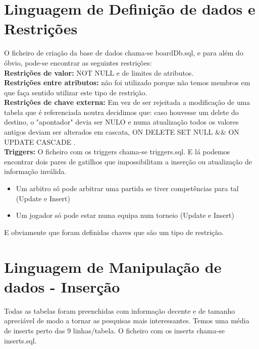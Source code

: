 \documentclass[a4paper]{article}
\begin{document}
\section{Linguagem de Definição de dados e Restrições}
O ficheiro de criação da base de dados chama-se boardDb.sql, e para além do óbvio, pode-se encontrar as seguintes restrições:
\\\newline
\textbf{Restrições de valor:} NOT NULL e de limites de atributos. \\
\textbf{Restrições entre atributos:} não foi utilizado porque não temos membros em que faça sentido utilizar este tipo de restrição. \\
\textbf{Restrições de chave externa:} Em vez de ser rejeitada a modificação de uma tabela que é referenciada noutra decidimos que: caso houvesse um delete do destino, o "apontador" devia ser NULO e numa atualização todos os valores antigos deviam ser alterados em cascata, ON DELETE SET NULL \&\& ON UPDATE CASCADE . \\
\textbf{Triggers:} O ficheiro com os triggers chama-se triggers.sql. E lá podemos encontrar dois pares de gatilhos que impossibilitam a inserção ou atualização de informação inválida.
\begin{itemize}
  \item Um arbitro só pode arbitrar uma partida se tiver competências para tal (Update e Insert)
  \item Um jogador só pode estar numa equipa num torneio (Update e Insert)
\end{itemize}

E obviamente que foram definidas chaves que são um tipo de restrição. \\
\section{Linguagem de Manipulação de dados - Inserção}
Todas as tabelas foram preenchidas com informação decente e de tamanho apreciável de modo a tornar as pesquisas mais interessantes. Temos uma média de inserts perto das 9 linhas/tabela. O ficheiro com os inserts chama-se inserts.sql.

\end{document}
